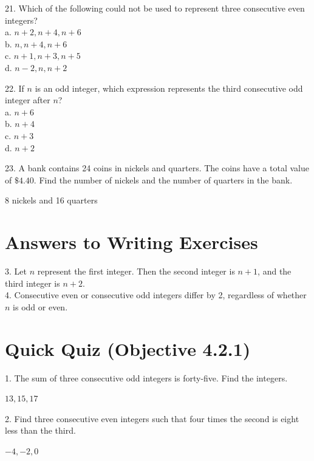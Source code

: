 \documentclass{ximera}
\begin{document}
\begin{exercise}
21. Which of the following could not be used to represent three consecutive even integers?\\
a. $n+2, n+4, n+6$\\
b. $n, n+4, n+6$\\
c. $n+1, n+3, n+5$\\
d. $n-2, n, n+2$
\end{exercise}

\begin{exercise}
22. If $n$ is an odd integer, which expression represents the third consecutive odd integer after $n$?\\
a. $n+6$\\
b. $n+4$\\
c. $n+3$\\
d. $n+2$
\end{exercise}

\begin{exercise}
23. A bank contains 24 coins in nickels and quarters. The coins have a total value of $\$ 4.40$. Find the number of nickels and the number of quarters in the bank.
\begin{solution}
8 nickels and 16 quarters
\end{solution}
\end{exercise}

\section*{Answers to Writing Exercises}
3. Let $n$ represent the first integer. Then the second integer is $n+1$, and the third integer is $n+2$.\\
4. Consecutive even or consecutive odd integers differ by 2, regardless of whether $n$ is odd or even.

\section*{Quick Quiz (Objective 4.2.1)}

\begin{exercise}
1. The sum of three consecutive odd integers is forty-five. Find the integers.
\begin{solution}
$13,15,17$
\end{solution}
\end{exercise}

\begin{exercise}
2. Find three consecutive even integers such that four times the second is eight less than the third.
\begin{solution}
$-4,-2,0$
\end{solution}
\end{exercise}
\end{document}
